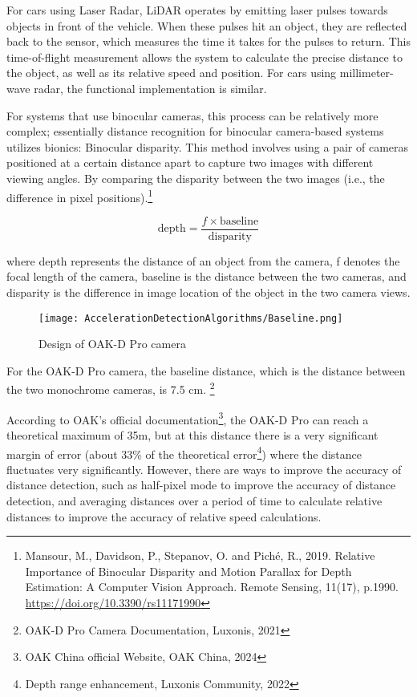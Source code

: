 For cars using Laser Radar, LiDAR operates by emitting laser pulses towards objects in front of the vehicle. When these pulses hit an object, they are reflected back to the sensor, which measures the time it takes for the pulses to return. This time-of-flight measurement allows the system to calculate the precise distance to the object, as well as its relative speed and position. For cars using millimeter-wave radar, the functional implementation is similar.

For systems that use binocular cameras, this process can be relatively more complex; essentially distance recognition for binocular camera-based systems utilizes bionics: Binocular disparity. This method involves using a pair of cameras positioned at a certain distance apart to capture two images with different viewing angles. By comparing the disparity between the two images (i.e., the difference in pixel positions).\footnote{Mansour, M., Davidson, P., Stepanov, O. and Piché, R., 2019. Relative Importance of Binocular Disparity and Motion Parallax for Depth Estimation: A Computer Vision Approach. Remote Sensing, 11(17), p.1990. \url{https://doi.org/10.3390/rs11171990}}

\begin{equation}
	\text{depth} = \frac{f \times \text{baseline}}{\text{disparity}}
\end{equation}

where depth represents the distance of an object from the camera, f denotes the focal length of the camera, baseline is the distance between the two cameras, and disparity is the difference in image location of the object in the two camera views.

\begin{figure}[H]
	\centering
	\begin{minipage}{1\textwidth}
		\centering
		\texttt{[image: AccelerationDetectionAlgorithms/Baseline.png]}
		\caption{Design of OAK-D Pro camera}
	\end{minipage}
\end{figure}

For the OAK-D Pro camera, the baseline distance, which is the distance between the two monochrome cameras, is 7.5 cm. \footnote{OAK-D Pro Camera Documentation, Luxonis, 2021}

According to OAK's official documentation\footnote{OAK China official Website, OAK China, 2024}, the OAK-D Pro can reach a theoretical maximum of 35m, but at this distance there is a very significant margin of error (about 33\% of the theoretical error\footnote{Depth range enhancement, Luxonis Community, 2022}) where the distance fluctuates very significantly. However, there are ways to improve the accuracy of distance detection, such as half-pixel mode to improve the accuracy of distance detection, and averaging distances over a period of time to calculate relative distances to improve the accuracy of relative speed calculations.


